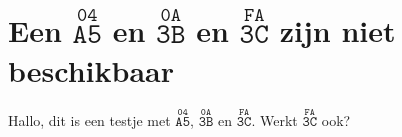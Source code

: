 \documentclass{article}
\def\MPUU#1#2#3#4{\mbox{$\scriptstyle\stackrel{\mathtt{#1#2}}{\scriptscriptstyle\mathtt{#3#4}}$}}
\def\MPI#1{\MPUU #1}
\def\MPU{\protect\MPI}
\begin{document}
\tableofcontents
\section{Een \MPU{04A5} en \MPU{0A3B} en \MPU{FA3C} zijn niet beschikbaar}
Hallo, dit is een testje met \MPU{04A5}, \MPU{0A3B} en \MPU{FA3C}. Werkt
\MPU{FA3C} ook?
\end{document}
